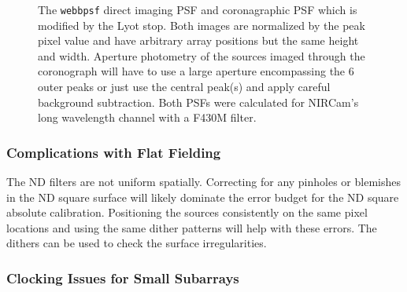 \documentclass{aastex6}
\begin{document}
\begin{figure}
\centering
{}
	\caption{The \texttt{webbpsf} direct imaging PSF and coronagraphic PSF which is modified by the Lyot stop. Both images are normalized by the peak pixel value and have arbitrary array positions but the same height and width. Aperture photometry of the sources imaged through the coronograph will have to use a large aperture encompassing the 6 outer peaks or just use the central peak(s) and apply careful background subtraction. Both PSFs were calculated for NIRCam's long wavelength channel with a F430M filter.\vspace{0.05in}}
	\label{fig:psfComparison}
\end{figure} 

\subsubsection{Complications with Flat Fielding}
The ND filters are not uniform spatially.
Correcting for any pinholes or blemishes in the ND square surface will likely dominate the error budget for the ND square absolute calibration.
Positioning the sources consistently on the same pixel locations and using the same dither patterns will help with these errors.
The dithers can be used to check the surface irregularities.

\subsubsection{Clocking Issues for Small Subarrays}
\end{document}
